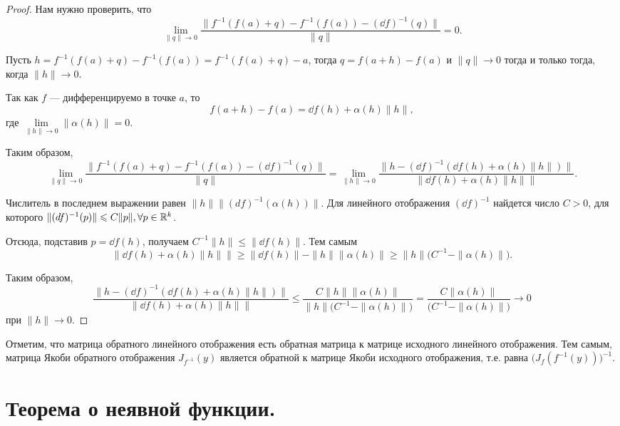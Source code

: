 \documentclass[a4paper]{article}
\theoremstyle{named}
\begin{document}
    \begin{proof}
        Нам нужно проверить, что
        $$
            \lim\limits_{\|q\|\to0}\dfrac{\|f^{-1}(f(a) + q)-f^{-1}(f(a)) - (\dd f)^{-1}(q)\|}{\|q\|}=0.
        $$

        Пусть $h=f^{-1}(f(a) + q)-f^{-1}(f(a))=f^{-1}(f(a) + q)-a$, тогда $q = f(a+h)-f(a)$ и $\|q\|\to 0$ тогда и только тогда, когда $\|h\|\to0$.

        Так как $f$ --- дифференцируемо в точке $a$, то $$f(a+h)-f(a) = \dd f(h)+\alpha(h)\|h\|,$$ где $\lim\limits_{\|h\|\to0}\|\alpha(h)\|=0$.

        Таким образом,
        $$
            \lim\limits_{\|q\|\to0}\dfrac{\|f^{-1}(f(a) + q)-f^{-1}(f(a)) - (\dd f)^{-1}(q)\|}{\|q\|}
            = \lim\limits_{\|h\|\to0}\dfrac{\bigl\|h - (\dd f)^{-1}(\dd f(h)+\alpha(h)\|h\|)\bigr\|}{\bigl\|\dd f(h)+\alpha(h)\|h\|\bigr\|}.
        $$

        Числитель в последнем выражении равен $\|h\|\bigl\|(df)^{-1}(\alpha(h))\bigr\|$. Для линейного отображения $(\dd f)^{-1}$ найдется число $C>0$, для которого $\|(\mathop{}\!d f)^{-1}(p)\| \leqslant C\|p\|,\forall p\in \mathbb{R}^k$.

        Отсюда, подставив $p=\dd f(h)$, получаем $C^{-1}\|h\|\leq\|\dd f(h)\|$. Тем самым $$\bigl\|\dd f(h)+\alpha(h)\|h\|\bigr\|\geq\|\dd f(h)\|-\|h\|\|\alpha(h)\|\geq\|h\|\bigl(C^{-1} - \|\alpha(h)\|\bigr).$$

        Таким образом,
        $$
            \dfrac{\bigl\|h - (\dd f)^{-1}(\dd f(h)+\alpha(h)\|h\|)\bigr\|}{\bigl\|\dd f(h)+\alpha(h)\|h\|\bigr\|}
            \leq \dfrac{C\|h\|\|\alpha(h)\|}{\|h\|\bigl(C^{-1} - \|\alpha(h)\|\bigr)}=
            \dfrac{C\|\alpha(h)\|}{\bigl(C^{-1} - \|\alpha(h)\|\bigr)}\to0
        $$
        при $\|h\|\to 0$.
    \end{proof}

    \begin{remark*}
        Отметим, что матрица обратного линейного отображения есть обратная матрица к матрице исходного линейного отображения.
        Тем самым, матрица Якоби обратного отображения $J_{f^{-1}}(y)$ является обратной к матрице Якоби исходного отображения,
        т.е. равна $\bigr(J_f(f^{-1}(y))\bigl)^{-1}$.
    \end{remark*}

    \section*{Теорема о неявной функции.}
\end{document}
